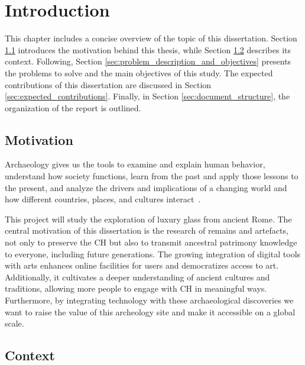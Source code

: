 
%

\chapter{Introduction}
\label{cha:introduction}

This chapter includes a concise overview of the topic of this dissertation. 
Section \ref{sec:motivation} introduces the motivation behind this thesis, while Section \ref{sec:context} describes its context.
Following, Section \ref{sec:problem_description_and_objectives} presents the problems to solve and the main objectives of this study. 
The expected contributions of this dissertation are discussed in Section \ref{sec:expected_contributions}.
Finally, in Section \ref{sec:document_structure}, the organization of the report is outlined.

\section{Motivation}
\label{sec:motivation}
Archaeology gives us the tools to examine and explain human behavior, understand how 
society functions, learn from the past and apply those lessons to the present, and analyze
the drivers and implications of a changing world and how different countries, places, and cultures interact~\cite{oxfordarchaeology2025}.

This project will study the exploration of luxury glass from ancient Rome.
The central motivation of this dissertation is the research of remains and artefacts, not
only to preserve the \gls{CH} but also to transmit ancestral patrimony knowledge to everyone, including future generations. 
The growing integration of digital tools with arts enhances online 
facilities for users and democratizes access to art. Additionally, it cultivates a deeper understanding of ancient cultures and traditions, allowing more people to engage with
\gls{CH} in meaningful ways. Furthermore, by integrating technology with these archaeological 
discoveries we want to raise the value of this archeology site and make it accessible on a global scale.


\section{Context}
\label{sec:context}

